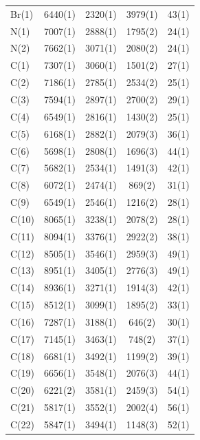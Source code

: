 \twocolumn
\begin{center}
\tablelasttail{\bottomrule} 
 {\footnotesize \singlespacing
\begin{supertabular}{lcccc}
Br(1)&6440(1)&2320(1)&3979(1)&43(1)\\
N(1)&7007(1)&2888(1)&1795(2)&24(1)\\
N(2)&7662(1)&3071(1)&2080(2)&24(1)\\
C(1)&7307(1)&3060(1)&1501(2)&27(1)\\
C(2)&7186(1)&2785(1)&2534(2)&25(1)\\
C(3)&7594(1)&2897(1)&2700(2)&29(1)\\
C(4)&6549(1)&2816(1)&1430(2)&25(1)\\
C(5)&6168(1)&2882(1)&2079(3)&36(1)\\
C(6)&5698(1)&2808(1)&1696(3)&44(1)\\
C(7)&5682(1)&2534(1)&1491(3)&42(1)\\
C(8)&6072(1)&2474(1)&869(2)&31(1)\\
C(9)&6549(1)&2546(1)&1216(2)&28(1)\\
C(10)&8065(1)&3238(1)&2078(2)&28(1)\\
C(11)&8094(1)&3376(1)&2922(2)&38(1)\\
C(12)&8505(1)&3546(1)&2959(3)&49(1)\\
C(13)&8951(1)&3405(1)&2776(3)&49(1)\\
C(14)&8936(1)&3271(1)&1914(3)&42(1)\\
C(15)&8512(1)&3099(1)&1895(2)&33(1)\\
C(16)&7287(1)&3188(1)&646(2)&30(1)\\
C(17)&7145(1)&3463(1)&748(2)&37(1)\\
C(18)&6681(1)&3492(1)&1199(2)&39(1)\\
C(19)&6656(1)&3548(1)&2076(3)&44(1)\\
C(20)&6221(2)&3581(1)&2459(3)&54(1)\\
C(21)&5817(1)&3552(1)&2002(4)&56(1)\\
C(22)&5847(1)&3494(1)&1148(3)&52(1)\\

\end{supertabular}}
\end{center}
